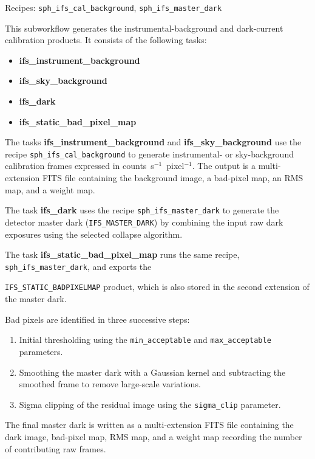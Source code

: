 Recipes:
\texttt{sph\_ifs\_cal\_background},
\texttt{sph\_ifs\_master\_dark}

This subworkflow generates the instrumental-background and dark-current calibration products. It consists of the following tasks:

\begin{itemize}
    \item \textbf{ifs\_instrument\_background}
    \item \textbf{ifs\_sky\_background}
    \item \textbf{ifs\_dark}
    \item \textbf{ifs\_static\_bad\_pixel\_map}
\end{itemize}

The tasks \textbf{ifs\_instrument\_background} and
\textbf{ifs\_sky\_background} use the recipe
\texttt{sph\_ifs\_cal\_background} to generate instrumental- or
sky-background calibration frames expressed in counts~s$^{-1}$~pixel$^{-1}$.
The output is a multi-extension FITS file containing the background image,
a bad-pixel map, an RMS map, and a weight map.

The task \textbf{ifs\_dark} uses the recipe
\texttt{sph\_ifs\_master\_dark} to generate the detector master dark
(\texttt{IFS\_MASTER\_DARK}) by combining the input raw dark exposures
using the selected collapse algorithm.

The task \textbf{ifs\_static\_bad\_pixel\_map} runs the same recipe,
\texttt{sph\_ifs\_master\_dark}, 
and exports the

\texttt{IFS\_STATIC\_BADPIXELMAP} product, which is also stored in the
second extension of the master dark.

Bad pixels are identified in three successive steps:

\begin{enumerate}
\item Initial thresholding using the
\texttt{min\_acceptable} and
\texttt{max\_acceptable} parameters.
\item Smoothing the master dark with a Gaussian kernel and subtracting the
smoothed frame to remove large-scale variations.
\item Sigma clipping of the residual image using the
\texttt{sigma\_clip} parameter.
\end{enumerate}

The final master dark is written as a multi-extension FITS file containing the dark image, bad-pixel map, RMS map, and a weight map recording the number of contributing raw frames.

